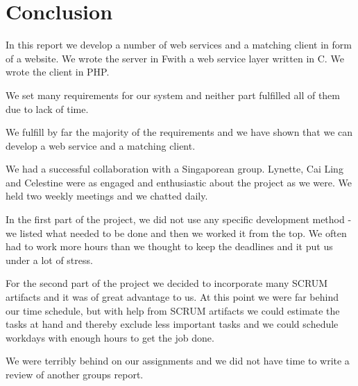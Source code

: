 \section{Conclusion}
In this report we develop a number of web services and a matching client in form of a website. We wrote the server in F\Sh with a web service layer written in C\Sh. We wrote the client in PHP.

We set many requirements for our system and neither part fulfilled all of them due to lack of time.

We fulfill by far the majority of the requirements and we have shown that we can develop a web service and a matching client.

We had a successful collaboration with a Singaporean group. Lynette, Cai Ling and Celestine were as engaged and enthusiastic about the project as we were. We held two weekly meetings and we chatted daily.

In the first part of the project, we did not use any specific development method - we listed what needed to be done and then we worked it from the top. We often had to work more hours than we thought to keep the deadlines and it put us under a lot of stress.

For the second part of the project we decided to incorporate many SCRUM artifacts and it was of great advantage to us. At this point we were far behind our time schedule, but with help from SCRUM artifacts we could estimate the tasks at hand and thereby exclude less important tasks and we could schedule workdays with enough hours to get the job done.

We were terribly behind on our assignments and we did not have time to write a review of another groups report.
\newpage